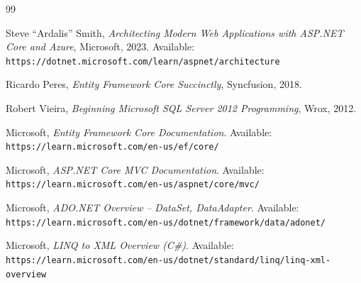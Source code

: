\documentclass[12pt,a4paper,oneside]{book}
\theoremstyle{plain}
\numberwithin{equation}{chapter}
\begin{document}
\begin{thebibliography}{99}

Steve ``Ardalis'' Smith, \textit{Architecting Modern Web Applications with ASP.NET Core and Azure}, Microsoft, 2023. Available: \texttt{https://dotnet.microsoft.com/learn/aspnet/architecture}

Ricardo Peres, \textit{Entity Framework Core Succinctly}, Syncfusion, 2018.

Robert Vieira, \textit{Beginning Microsoft SQL Server 2012 Programming}, Wrox, 2012.

Microsoft, \textit{Entity Framework Core Documentation}. Available: \texttt{https://learn.microsoft.com/en-us/ef/core/}

Microsoft, \textit{ASP.NET Core MVC Documentation}. Available: \texttt{https://learn.microsoft.com/en-us/aspnet/core/mvc/}

Microsoft, \textit{ADO.NET Overview -- DataSet, DataAdapter}. Available: \texttt{https://learn.microsoft.com/en-us/dotnet/framework/data/adonet/}

Microsoft, \textit{LINQ to XML Overview (C\#)}. Available: \texttt{https://learn.microsoft.com/en-us/dotnet/standard/linq/linq-xml-overview}

\end{thebibliography}
\end{document}
